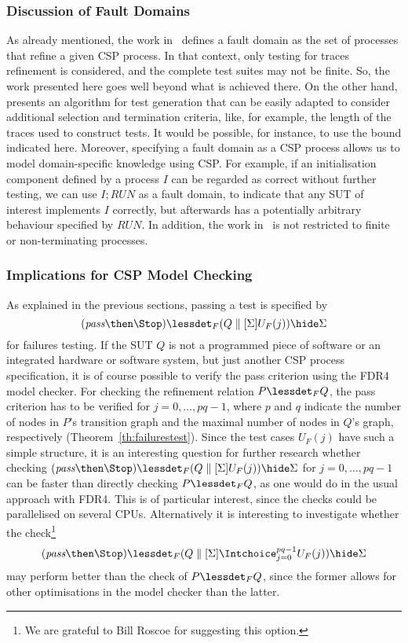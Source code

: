 \subsubsection*{Discussion of Fault Domains}
As already mentioned, the work in~\cite{DBLP:conf/pts/CavalcantiS17} defines
a fault domain as the set of processes that refine a given CSP process.  In
that context, only testing for traces refinement is considered, and the
complete test suites may not be finite. So, the work presented here goes well
beyond what is achieved there. On the other hand,
\cite{DBLP:conf/pts/CavalcantiS17} presents an algorithm for test generation
that can be easily adapted to consider additional selection and termination
criteria, like, for example, the length of the traces used to construct
tests. It would be possible, for instance, to use the bound indicated here.
Moreover, specifying a fault domain as a CSP process allows us to model
domain-specific knowledge using CSP. For example, if an initialisation
component defined by a process $I$ can be regarded as correct without further
testing, we can use $I; RUN$ as a fault domain, to indicate that any SUT of
interest implements $I$ correctly, but afterwards has a potentially arbitrary
behaviour specified by $RUN$. In addition, the work
in~\cite{DBLP:conf/pts/CavalcantiS17} is not restricted to finite or
non-terminating processes.

\subsubsection*{Implications for CSP Model Checking}
As explained in the previous sections, passing a test is specified by
$$(\epass\then\Stop) \lessdet_F (Q\parallel[\Sigma] U_F(j)) \hide \Sigma$$ for
failures testing. If the SUT $Q$ is not a programmed piece of software or an
integrated hardware or software system, but just another CSP process
specification, it is of course possible to verify the pass criterion using
the FDR4 model checker. For checking the refinement relation $P\lessdet_F Q$,
the pass criterion has to be verified for $j=0,\dots,pq-1$, where $p$ and $q$
indicate the number of nodes in $P$'s transition graph and the maximal number
of nodes in $Q$'s graph, respectively (Theorem~\ref{th:failurestest}). Since
the test cases $U_F(j)$ have such a simple structure, it is an interesting
question for further research whether checking $(\epass\then\Stop) \lessdet_F
(Q\parallel[\Sigma] U_F(j)) \hide \Sigma$ for $j=0,\dots,pq-1$ can be faster
than directly checking $P\lessdet_F Q$, as one would do in the usual approach
with FDR4. This is of particular interest, since the checks could be
parallelised on several CPUs. Alternatively it is interesting to investigate
whether the check\footnote{We are grateful to Bill Roscoe for suggesting this
option.}
\[
(\epass\then\Stop) \lessdet_F (Q\parallel[\Sigma] \Intchoice_{j=0}^{pq-1} U_F(j)) \hide \Sigma
\]
may perform better than the check of $P\lessdet_F Q$, since the former allows for
other optimisations in the model checker than the latter.

